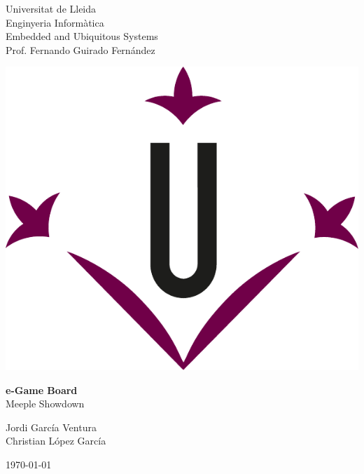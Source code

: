 \documentclass[../main.tex]{subfiles}
\begin{document}
\begin{titlepage}
    \begin{minipage}[c]{0.4\linewidth}
    Universitat de Lleida \\
    Enginyeria Informàtica \\
    Embedded and Ubiquitous Systems \\
    Prof. Fernando Guirado Fernández
    \end{minipage}
    \hfill
    \begin{minipage}[c]{0.5\linewidth}
    \hfill
    \includegraphics[width=0.4\linewidth]{media/figures//udl_logo.pdf}
    \end{minipage}
        
    \vspace{5cm}

     \begin{center}
        \Huge
        \textbf{e-Game Board} \\ Meeple Showdown 
     \end{center}        
            
    \vspace{5cm}
        
    \begin{flushright}
        \large
        Jordi García Ventura \\
        Christian López García
    \end{flushright}
        
    \vfill
        
    \begin{center}
        \today
    \end{center}
\end{titlepage}
\end{document}
